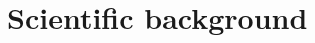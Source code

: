 \documentclass[
oneside,
a4paper,
12pt,
titlepage]
{article}
\begin{document}

\newpage

\newpage
\pagestyle{standard}


\section{Scientific background}



\newpage

\end{document}

